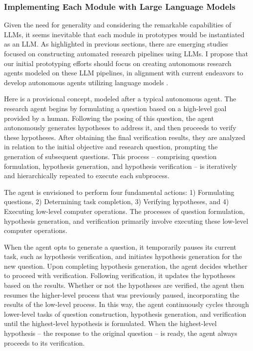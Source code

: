 
\subsubsection{Implementing Each Module with Large Language Models}

Given the need for generality and considering the remarkable capabilities of LLMs, it seems inevitable that each module in prototypes would be instantiated as an LLM. As highlighted in previous sections, there are emerging studies focused on constructing automated research pipelines using LLMs. I propose that our initial prototyping efforts should focus on creating autonomous research agents modeled on these LLM pipelines, in alignment with current endeavors to develop autonomous agents utilizing language models \cite{wang2023survey,xi2023rise}.

Here is a provisional concept, modeled after a typical autonomous agent. The research agent begins by formulating a question based on a high-level goal provided by a human. Following the posing of this question, the agent autonomously generates hypotheses to address it, and then proceeds to verify these hypotheses. After obtaining the final verification results, they are analyzed in relation to the initial objective and research question, prompting the generation of subsequent questions. This process – comprising question formulation, hypothesis generation, and hypothesis verification – is iteratively and hierarchically repeated to execute each subprocess.

The agent is envisioned to perform four fundamental actions: 1) Formulating questions, 2) Determining task completion, 3) Verifying hypotheses, and 4) Executing low-level computer operations. The processes of question formulation, hypothesis generation, and verification primarily involve executing these low-level computer operations.

When the agent opts to generate a question, it temporarily pauses its current task, such as hypothesis verification, and initiates hypothesis generation for the new question. Upon completing hypothesis generation, the agent decides whether to proceed with verification. Following verification, it updates the hypotheses based on the results. Whether or not the hypotheses are verified, the agent then resumes the higher-level process that was previously paused, incorporating the results of the low-level process. In this way, the agent continuously cycles through lower-level tasks of question construction, hypothesis generation, and verification until the highest-level hypothesis is formulated. When the highest-level hypothesis – the response to the original question – is ready, the agent always proceeds to its verification.

